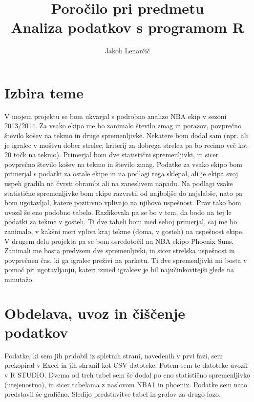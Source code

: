 \documentclass[11pt,a4paper]{article}
\begin{document}
\title{Poročilo pri predmetu \\
Analiza podatkov s programom R}
\author{Jakob Lenarčič}
\maketitle

\section{Izbira teme}

V mojem projektu se bom ukvarjal s podrobno analizo NBA ekip v sezoni 2013/2014. Za vsako ekipo me bo zanimalo število zmag in porazov, povprečno število košev na tekmo in druge spremenljivke. Nekatere bom dodal sam (npr. ali je igralec v moštvu dober strelec; kriterij za dobrega strelca pa bo recimo več kot 20 točk na tekmo). Primerjal bom dve statistični spremenljivki, in sicer povprečno število košev na tekmo in število zmag. Podatke za vsako ekipo bom primerjal s podatki za ostale ekipe in na podlagi tega sklepal, ali je ekipa svoj uspeh gradila na čvrsti obrambi ali na zaneslivem napadu. Na podlagi vsake statistične spremenljivke bom ekipe razvrstil od najboljše do najslabše, nato pa bom ugotavljal, katere pozitivno vplivajo na njihovo uspešnost.
Prav tako bom uvozil še eno podobno tabelo. Razlikovala pa se bo v tem, da bodo na tej le podatki za tekme v gosteh. Ti dve tabeli bom med seboj primerjal, saj me bo zanimalo, v kakšni meri vpliva kraj tekme (doma, v gosteh) na uspešnost ekipe.
V drugem delu projekta pa se bom osredotočil na NBA ekipo Phoenix Suns. Zanimali me bosta predvsem dve spremenljivki, in sicer strelska uspešnost in povprečnen čas, ki ga igralec preživi na parketu. Ti dve   spremenljivki mi bosta v pomoč pri ugotavljanju, kateri izmed igralcev je bil najučinkovitejši glede na minutažo.



\section{Obdelava, uvoz in čiščenje podatkov}

Podatke, ki sem jih pridobil iz spletnih strani, navedenih v prvi fazi, sem prekopiral v Excel in jih shranil kot CSV datoteke. Potem sem te datoteke uvozil v R STUDIO. Dvema od treh tabel sem še dodal po eno statistično spremenljivko (urejenostno), in sicer tabelama z naslovom NBA1 in phoenix. Podatke sem nato predstavil še grafično. Sledijo predstavitve tabel in grafov za drugo fazo.
\newpage
\end{document}
